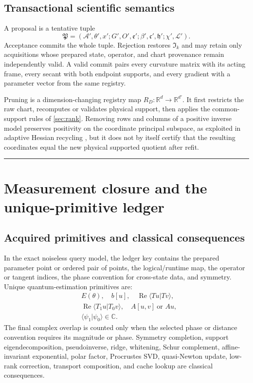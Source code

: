 \documentclass[10pt,twocolumn]{article}
\newcommand{\mathscr}[1]{\mathcal{#1}}
\newcommand{\cref}[1]{\autoref{#1}}
\theoremstyle{definition}
\theoremstyle{remark}
\newcommand{\conceptbreak}{\par\vspace{0.45em}\noindent\textcolor{navy!55}{\rule{\columnwidth}{0.35pt}}\vspace{0.35em}\par}
\newcommand{\R}{\mathbb R}
\newcommand{\C}{\mathbb C}
\newcommand{\Rea}{\operatorname{Re}}
\begin{document}
\subsection{Transactional scientific semantics}

A proposal is a tentative tuple
\begin{equation}
\mathfrak P=(\mathcal A',\theta',x';G',O',\mathfrak e';\beta',\mathfrak c',\mathfrak h';\chi',\mathscr L').
\end{equation}
Acceptance commits the whole tuple.  Rejection restores $\mathfrak I_k$ and may retain only acquisitions whose prepared state, operator, and chart provenance remain independently valid.  A valid commit pairs every curvature matrix with its acting frame, every secant with both endpoint supports, and every gradient with a parameter vector from the same registry.

Pruning is a dimension-changing registry map $R_D:\R^d\to\R^{d'}$.  It first restricts the raw chart, recomputes or validates physical support, then applies the common-support rules of \cref{sec:rank}.  Removing rows and columns of a positive inverse model preserves positivity on the coordinate principal subspace, as exploited in adaptive Hessian recycling \cite{Ramoa2025}, but it does not by itself certify that the resulting coordinates equal the new physical supported quotient after refit.

\conceptbreak

\section{Measurement closure and the unique-primitive ledger}
\label{sec:ledger}

\subsection{Acquired primitives and classical consequences}

In the exact noiseless query model, the ledger key contains the prepared parameter point or ordered pair of points, the logical/runtime map, the operator or tangent indices, the phase convention for cross-state data, and symmetry.  Unique quantum-estimation primitives are:
\begin{align}
 &E(\theta),\quad b[u],\quad
 \Rea\langle T u|Tv\rangle,\nonumber\\
 &\Rea\langle T_1u|T_0v\rangle,\quad
 A[u,v]\ \text{or }Au,\nonumber\\
 &\langle\psi_1|\psi_0\rangle\in\C.
 \label{eq:primitives}
\end{align}
The final complex overlap is counted only when the selected phase or distance convention requires its magnitude or phase.  Symmetry completion, support eigendecomposition, pseudoinverse, ridge, whitening, Schur complement, affine-invariant exponential, polar factor, Procrustes SVD, quasi-Newton update, low-rank correction, transport composition, and cache lookup are classical consequences.
\end{document}
